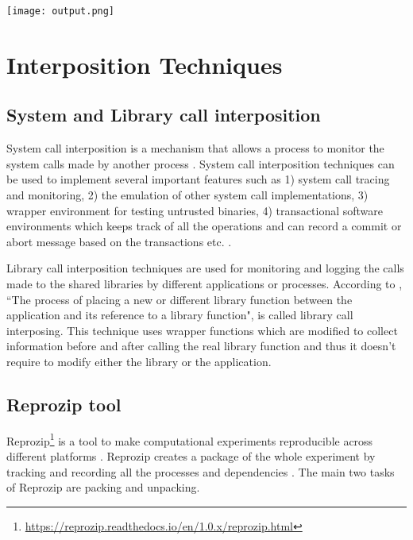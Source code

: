 \begin{center}
\texttt{[image: output.png]}
\label{fig:output}
\end{center}

\section{Interposition Techniques}

\subsection{System and Library call interposition}
System call interposition is a mechanism that allows a process to monitor the system calls made by another process \cite{Jain00user-levelinfrastructure}. System call interposition techniques can be used to implement several important features such as 1) system call tracing and monitoring, 2) the emulation of other system call implementations, 3) wrapper environment for testing untrusted binaries, 4) transactional software environments which keeps track of all the operations and can record a commit or abort message based on the transactions etc. \cite{Jones93}.

Library call interposition techniques are used for monitoring and logging the calls made to the shared libraries by different applications or processes. According to \cite{Curry:1994:PTD:1267257.1267275}, ``The process of placing a new or different library function between the application and its reference to a library function", is called library call interposing. This technique uses wrapper functions which are modified to collect information before and after calling the real library function and thus it doesn't require to modify either the library or the application.

\subsection{Reprozip tool}
Reprozip\footnote{\url{https://reprozip.readthedocs.io/en/1.0.x/reprozip.html}} is a tool to make computational experiments reproducible across different platforms \cite{Chirigati:2013:RUP:2482613.2482614}. Reprozip creates a package of the whole experiment by tracking and recording all the processes and dependencies . The main two tasks of Reprozip are packing and unpacking.

